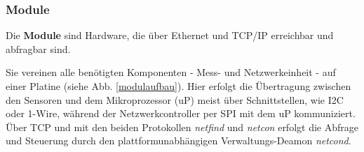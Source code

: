 \documentclass[a4paper,14pt,headsepline]{scrartcl}
\begin{document}
\subsubsection{Module}
Die \textbf{Module} sind Hardware, die über Ethernet und TCP/IP erreichbar und abfragbar sind. 

\begin{figure}[h]
\begin{center}
\end{center}
\end{figure}

\newpage

Sie vereinen alle benötigten Komponenten - Mess- und Netzwerkeinheit - auf einer Platine (siehe Abb. \ref{modulaufbau}). Hier erfolgt die Übertragung zwischen den Sensoren und dem Mikroprozessor (uP) meist über Schnittstellen, wie I2C oder 1-Wire, während der Netzwerkcontroller per SPI mit dem uP kommuniziert. Über TCP und mit den beiden Protokollen \textit{netfind} und \textit{netcon} erfolgt die Abfrage und Steuerung durch den plattformunabhängigen Verwaltungs-Deamon \textit{netcond}. 
\end{document}
